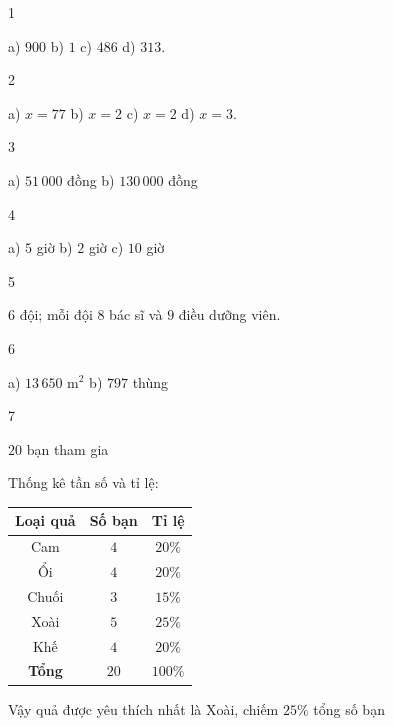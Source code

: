\begin{Solbook}{1}
 \par \noindent a) $900$ \hfill b) $1$ \hfill c) $486$ \hfill d) $313$. \hfill \qedEX 
\end{Solbook}
\begin{Solbook}{2}
 \par \noindent a) $x = 77$ \hfill b) $x = 2$ \hfill c) $x = 2$ \hfill d) $x = 3$.  \hfill \qedEX 
\end{Solbook}
\begin{Solbook}{3}
 \par \noindent  a) $51\,000$ đồng \hfill b) $130\,000$ đồng  \hfill \qedEX 
\end{Solbook}
\begin{Solbook}{4}
 \par \noindent  a) $5$ giờ \hfill b) $2$ giờ \hfill c) $10$ giờ  \hfill \qedEX 
\end{Solbook}
\begin{Solbook}{5}
 \par \noindent  $6$ đội; mỗi đội $8$ bác sĩ và $9$ điều dưỡng viên. \hfill \qedEX 
\end{Solbook}
\begin{Solbook}{6}
 \par \noindent a) $13\,650$ m$^2$ \hfill b) $797$ thùng  \hfill \qedEX 
\end{Solbook}
\begin{Solbook}{7}
 \par \noindent  \begin {listEX} \item $20$ bạn tham gia \item Thống kê tần số và tỉ lệ: \par \begin {center} \begin {tabular}{|c|c|c|} \hline \textbf {Loại quả} & \textbf {Số bạn} & \textbf {Tỉ lệ} \\ \hline Cam & $4$ & $20\%$ \\ \hline Ổi & $4$ & $20\%$ \\ \hline Chuối & $3$ & $15\%$ \\ \hline Xoài & $5$ & $25\%$ \\ \hline Khế & $4$ & $20\%$ \\ \hline \textbf {Tổng} & $20$ & $100\%$ \\ \hline \end {tabular} \end {center} \par Vậy quả được yêu thích nhất là Xoài, chiếm $25\%$ tổng số bạn \end {listEX} \hfill \qedEX 
\end{Solbook}
